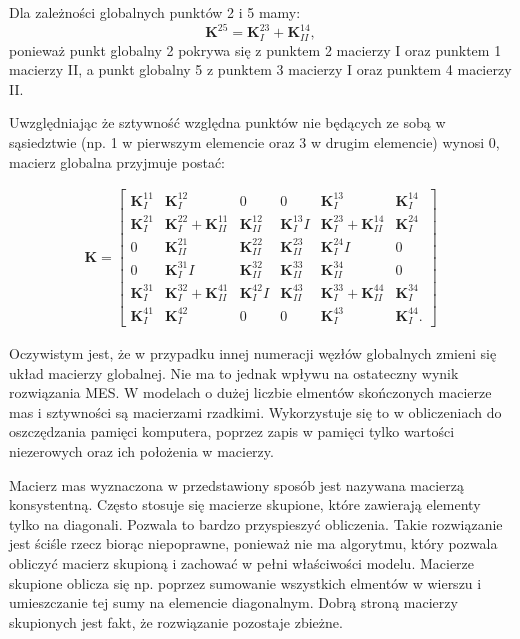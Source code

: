 Dla zależności globalnych punktów 2 i 5 mamy:
\begin{equation}
	\textbf{K}^{25} = \textbf{K}_{I}^{23} + \textbf{K}_{II}^{14},
\end{equation}
ponieważ punkt globalny 2 pokrywa się z punktem 2 macierzy I oraz punktem 1 macierzy II, a punkt globalny 5 z punktem 3 macierzy I oraz punktem 4 macierzy II.

Uwzględniając że sztywność względna punktów nie będących ze sobą w sąsiedztwie (np. 1 w pierwszym elemencie oraz 3 w drugim elemencie) wynosi 0, macierz globalna przyjmuje postać:

\begin{gather}
	\textbf{K} = \begin{bmatrix} 
	 	\textbf{K}^{11}_I & \textbf{K}^{12}_I & 0 & 0 & \textbf{K}^{13}_I & \textbf{K}^{14}_I  \\
	 	\textbf{K}^{21}_I & \textbf{K}^{22}_I + \textbf{K}^{11}_{II}  & \textbf{K}^{12}_{II} & \textbf{K}^{13}_II & \textbf{K}_{I}^{23} + \textbf{K}_{II}^{14} & \textbf{K}^{24}_I \\
	 	0 & \textbf{K}^{21}_{II} & \textbf{K}^{22}_{II} & \textbf{K}^{23}_{II} & \textbf{K}^{24}_II & 0 \\
	 	0 & \textbf{K}^{31}_II & \textbf{K}^{32}_{II} & \textbf{K}^{33}_{II} & \textbf{K}^{34}_{II} & 0 \\
		\textbf{K}^{31}_I & \textbf{K}_{I}^{32} + \textbf{K}_{II}^{41} & \textbf{K}^{42}_II & \textbf{K}^{43}_{II} & \textbf{K}^{33}_{I} + \textbf{K}	^{44}_{II} & \textbf{K}^{34}_{I} \\
		\textbf{K}^{41}_I & \textbf{K}^{42}_I & 0 & 0 & \textbf{K}^{43}_I & \textbf{K}^{44}_I.
	\end{bmatrix}
\end{gather}

Oczywistym jest, że w przypadku innej numeracji węzłów globalnych zmieni się układ macierzy globalnej. Nie ma to jednak wpływu na ostateczny wynik rozwiązania MES. W modelach o dużej liczbie elmentów skończonych macierze mas i sztywności są macierzami rzadkimi. Wykorzystuje się to w obliczeniach do oszczędzania pamięci komputera, poprzez zapis w pamięci tylko wartości niezerowych oraz ich położenia w macierzy. 

Macierz mas wyznaczona w przedstawiony sposób jest nazywana macierzą konsystentną. Często stosuje się macierze skupione, które zawierają elementy tylko na diagonali. Pozwala to bardzo przyspieszyć obliczenia. Takie rozwiązanie jest ściśle rzecz biorąc niepoprawne, ponieważ nie ma algorytmu, który pozwala obliczyć macierz skupioną i zachować w pełni właściwości modelu. Macierze skupione oblicza się np. poprzez sumowanie wszystkich elmentów w wierszu i umieszczanie tej sumy na elemencie diagonalnym. Dobrą stroną macierzy skupionych jest fakt, że rozwiązanie pozostaje zbieżne.



















